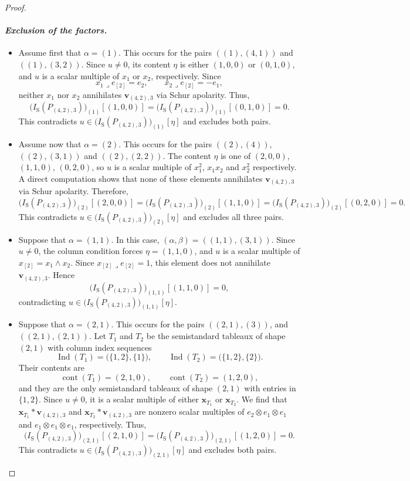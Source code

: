 \documentclass[a4paper,reqno]{amsart}
\theoremstyle{plainnopunct}
\theoremstyle{definitionnopunct}
\newcommand{\ind}{\operatorname{Ind}}
\newcommand{\bx}{\mathbf{x}}
\newcommand{\bv}{\mathbf{v}}
\DeclareMathOperator{\cont}{cont}
\begin{document}
\begin{proof}
\paragraph{\textit{Exclusion of the factors.}}
\begin{itemize}
    \item 
Assume first that $\alpha=(1)$.
This occurs for the pairs $((1),(4,1))$ and $((1),(3,2))$. Since $u\neq0$, its content $\eta$ is either $(1,0,0)$ or $(0,1,0)$, and $u$ is a scalar multiple of $x_1$ or $x_2$, respectively. Since
\[
x_1\mathbin{\lrcorner}e_{[2]}
=
e_2,
\qquad
x_2\mathbin{\lrcorner}e_{[2]}
=
-e_1,
\]
neither $x_1$ nor $x_2$ annihilates $\bv_{(4,2),3}$ via Schur apolarity. Thus,
\[
\bigl(I_{\mathrm S}(P_{(4,2),3})\bigr)_{(1)}[(1,0,0)]
=
\bigl(I_{\mathrm S}(P_{(4,2),3})\bigr)_{(1)}[(0,1,0)]
=
0.
\]
This contradicts $u
\in
\bigl(I_{\mathrm S}(P_{(4,2),3})\bigr)_{(1)}[\eta]$ and excludes both pairs.
\item 
Assume now that $\alpha=(2)$.
This occurs for the pairs $((2),(4))$, $((2),(3,1))$ and $((2),(2,2))$. 
The content $\eta$ is one of $(2,0,0)$, $(1,1,0)$, $(0,2,0)$, so $u$ is a scalar multiple of $x_1^2$, $x_1x_2$ and $x_2^2$ respectively. A direct computation shows that none of these elements annihilates $\bv_{(4,2),3}$ via Schur apolarity. Therefore,
\[
\bigl(I_{\mathrm S}(P_{(4,2),3})\bigr)_{(2)}[(2,0,0)]
 =
\bigl(I_{\mathrm S}(P_{(4,2),3})\bigr)_{(2)}[(1,1,0)] =
\bigl(I_{\mathrm S}(P_{(4,2),3})\bigr)_{(2)}[(0,2,0)]
=0.
\]
This contradicts $u
\in
\bigl(I_{\mathrm S}(P_{(4,2),3})\bigr)_{(2)}[\eta]$
and excludes all three pairs.
\item  Suppose that $\alpha=(1,1)$.
In this case, $(\alpha,\beta) = ((1,1),(3,1))$. Since $u\neq0$, the column condition forces $\eta=(1,1,0)$, and $u$ is a scalar multiple of $x_{[2]} = x_1\wedge x_2$. Since $x_{[2]}\mathbin{\lrcorner}e_{[2]} = 1$, this element does not annihilate $\bv_{(4,2),3}$. Hence
\[
\bigl(I_{\mathrm S}(P_{(4,2),3})\bigr)_{(1,1)}[(1,1,0)]
=
0,
\]
contradicting $u \in \bigl(I_{\mathrm S}(P_{(4,2),3})\bigr)_{(1,1)}[\eta]$.

\item Suppose that $\alpha=(2,1)$.
This occurs for the pairs $((2,1),(3))$, and $((2,1),(2,1))$. Let $T_1$ and $T_2$ be the semistandard tableaux of shape $(2,1)$ with column index sequences
\[
\ind(T_1)
=
\bigl(
\{1,2\},
\{1\}
\bigr),
\qquad
\ind(T_2)
=
\bigl(
\{1,2\},
\{2\}
\bigr).
\]
Their contents are
\[
\cont(T_1)=(2,1,0),
\qquad
\cont(T_2)=(1,2,0),
\]
and they are the only semistandard tableaux of shape $(2,1)$ with entries in $\{1,2\}$. Since $u\neq0$, it is a scalar multiple of either $\bx_{T_1}$ or $\bx_{T_2}$. We find that $\bx_{T_1}*\bv_{(4,2),3}$ and $\bx_{T_2}*\bv_{(4,2),3}$ are nonzero scalar multiples of $e_2\otimes e_1\otimes e_1$ and $e_1\otimes e_1\otimes e_1$, respectively. Thus,
\[
\bigl(I_{\mathrm S}(P_{(4,2),3})\bigr)_{(2,1)}[(2,1,0)]
=\bigl(I_{\mathrm S}(P_{(4,2),3})\bigr)_{(2,1)}[(1,2,0)]
=0.
\]
This contradicts $u
\in
\bigl(I_{\mathrm S}(P_{(4,2),3})\bigr)_{(2,1)}[\eta]$ and excludes both pairs.


\end{itemize}
\end{proof}
\end{document}
